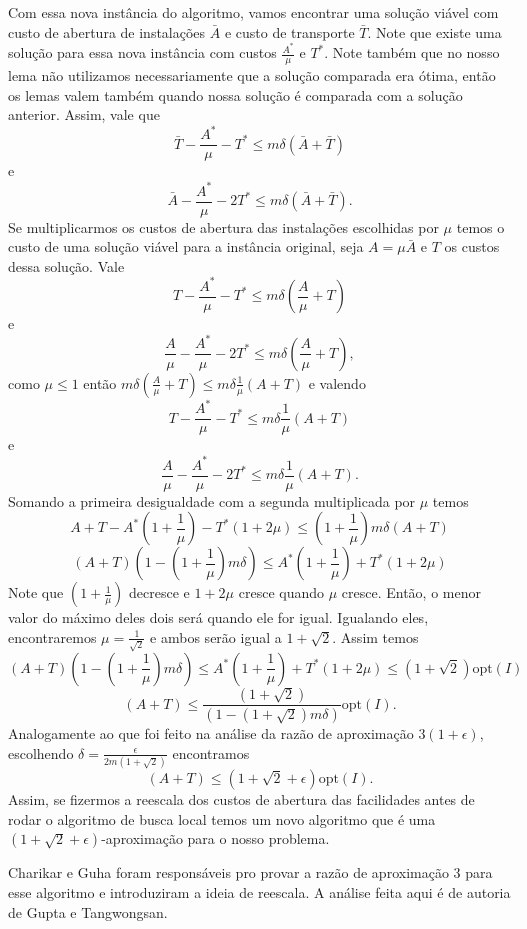 \documentclass[12pt]{article}
\newcommand{\opt}{\ensuremath{\mathrm{opt}}}
\begin{document}
Com essa nova instância do algoritmo, vamos encontrar uma solução viável com custo de abertura de instalações $\bar{A}$ e custo de transporte $\bar{T}$. Note que existe uma solução para essa nova instância com custos $\frac{A^*}{\mu}$ e $T^*$. Note também que no nosso lema não utilizamos necessariamente que a solução comparada era ótima, então os lemas valem também quando nossa solução é comparada com a solução anterior. Assim, vale que
\[ \bar{T} - \frac{A^*}{\mu} - T^* \leq m\delta(\bar{A} + \bar{T})\]
e
\[ \bar{A} - \frac{A^*}{\mu} - 2T^* \leq m\delta(\bar{A} + \bar{T}).\]
Se multiplicarmos os custos de abertura das instalações escolhidas por $\mu$ temos o custo de uma solução viável para a instância original, seja $A = \mu\bar{A}$ e $T$ os custos dessa solução. Vale
\[ T - \frac{A^*}{\mu} - T^* \leq m\delta(\frac{A}{\mu}+ T)\]
e
\[ \frac{A}{\mu} - \frac{A^*}{\mu} - 2T^* \leq m\delta(\frac{A}{\mu} + T),\]
como $\mu \leq 1$ então $m\delta(\frac{A}{\mu}+ T) \leq m\delta\frac{1}{\mu}( A + T)$ e valendo 
\[T - \frac{A^*}{\mu} - T^* \leq m\delta\frac{1}{\mu}( A + T) \] 
e 
\[ \frac{A}{\mu} - \frac{A^*}{\mu} - 2T^* \leq m\delta\frac{1}{\mu}( A + T) .\]
Somando a primeira desigualdade com a segunda multiplicada por $\mu$ temos
\[A + T - A^* (1 + \frac{1}{\mu}) - T^*(1 + 2\mu) \leq (1 + \frac{1}{\mu})m\delta(A+T)\]
\[(A+T)(1 - (1+\frac{1}{\mu})m\delta)\leq A^* (1 + \frac{1}{\mu}) + T^*(1 + 2\mu)\]
Note que $(1+\frac{1}{\mu})$ decresce e $1 + 2\mu$ cresce quando $\mu$ cresce. Então, o menor valor do máximo deles dois será quando ele for igual. Igualando eles, encontraremos $\mu = \frac{1}{\sqrt{2}}$ e ambos serão igual a $1 + \sqrt{2}$. Assim temos
\[(A+T)(1 - (1+\frac{1}{\mu})m\delta)\leq A^* (1 + \frac{1}{\mu}) + T^*(1 + 2\mu) \leq (1+\sqrt{2})\opt(I)\]
\[(A+T)\leq \frac{(1+\sqrt{2})}{(1 - (1+\sqrt{2 })m\delta)}\opt(I).\]
Analogamente ao que foi feito na análise da razão de aproximação $3(1 + \epsilon)$, escolhendo $\delta = \frac{\epsilon}{2m(1+\sqrt{2})}$ encontramos 
\[(A+T) \leq (1 + \sqrt{2} + \epsilon )\opt(I).\]
Assim, se fizermos a reescala dos custos de abertura das facilidades antes de rodar o algoritmo de busca local temos um novo algoritmo que é uma $(1 + \sqrt{2} + \epsilon )$-aproximação para o nosso problema.

Charikar e Guha foram responsáveis pro provar a razão de aproximação 3 para esse algoritmo e introduziram a ideia de reescala. A análise feita aqui é de autoria de Gupta e Tangwongsan. 
\newpage


\end{document}
